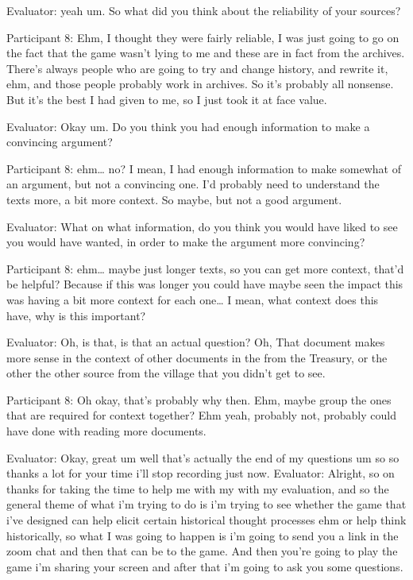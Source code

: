 \documentclass{l4proj}
\begin{document}
\begin{appendices}
Evaluator: yeah um. So what did you think about the reliability of your sources?

Participant 8: Ehm, I thought they were fairly reliable, I was just going to go on the fact that the game wasn’t lying to me and these are in fact from the archives. There’s always people who are going to try and change history, and rewrite it, ehm, and those people probably work in archives. So it’s probably all nonsense. But it’s the best I had given to me, so I just took it at face value. 

Evaluator: Okay um. Do you think you had enough information to make a convincing argument?

Participant 8: ehm… no? I mean, I had enough information to make somewhat of an argument, but not a convincing one. I’d probably need to understand the texts more, a bit more context. So maybe, but not a good argument. 

Evaluator: What on what information, do you think you would have liked to see you would have wanted, in order to make the argument more convincing?

Participant 8: ehm… maybe just longer texts, so you can get more context, that’d be helpful? Because if this was longer you could have maybe seen the impact this was having a bit more context for each one… I mean, what context does this have, why is this important?

Evaluator: Oh, is that, is that an actual question? Oh, That document makes more sense in the context of other documents in the from the Treasury, or the other the other source from the village that you didn't get to see.

Participant 8: Oh okay, that’s probably why then. Ehm,  maybe group the ones that are required for context together? Ehm yeah, probably not, probably could have done with reading more documents. 

Evaluator: Okay, great um well that's actually the end of my questions um so so thanks a lot for your time i'll stop recording just now.
Evaluator: Alright, so on thanks for taking the time to help me with my with my evaluation, and so the general theme of what i'm trying to do is i'm trying to see whether the game that i've designed can help elicit certain historical thought processes ehm or help think historically, so what I was going to happen is i'm going to send you a link in the zoom chat and then that can be to the game. And then you're going to play the game i'm sharing your screen and after that i'm going to ask you some questions.


\end{appendices}
\end{document}
